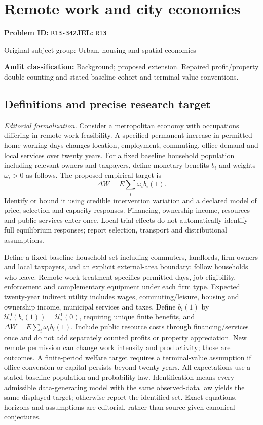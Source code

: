 \documentclass[11pt,a4paper]{article}
\begin{document}
\section*{Remote work and city economies}
\textbf{Problem ID:} \texttt{R13-342}\quad \textbf{JEL:} \texttt{R13}\par
\label{problem:OP-0468}
{\sffamily\small\color{muted}Original subject group: Urban, housing and spatial economics\par}
\label{definitions:problem:30007750}
\textbf{Audit classification:} Background; proposed extension. Repaired profit/property double counting and stated baseline-cohort and terminal-value conventions.
\subsection*{Definitions and precise research target}
\textit{Editorial formalization.} Consider a metropolitan economy with occupations differing in remote-work feasibility. A specified permanent increase in permitted home-working days changes location, employment, commuting, office demand and local services over twenty years. For a fixed baseline household population including relevant owners and taxpayers, define monetary benefits \(b_i\) and weights \(\omega_i>0\) as follows. The proposed empirical target is \[\Delta W=E\sum_i\omega_i b_i(1).\] Identify or bound it using credible intervention variation and a declared model of price, selection and capacity responses. Financing, ownership income, resources and public services enter once. Local trial effects do not automatically identify full equilibrium responses; report selection, transport and distributional assumptions.

Define a fixed baseline household set including commuters, landlords, firm owners and local taxpayers, and an explicit external-area boundary; follow households who leave. Remote-work treatment specifies permitted days, job eligibility, enforcement and complementary equipment under each firm type. Expected twenty-year indirect utility includes wages, commuting/leisure, housing and ownership income, municipal services and taxes. Define \(b_i(1)\) by \(\mathcal U_i^0(b_i(1))=\mathcal U_i^1(0)\), requiring unique finite benefits, and \(\Delta W=E\sum_i\omega_i b_i(1)\). Include public resource costs through financing/services once and do not add separately counted profits or property appreciation. New remote permission can change work intensity and productivity; those are outcomes. A finite-period welfare target requires a terminal-value assumption if office conversion or capital persists beyond twenty years. All expectations use a stated baseline population and probability law. Identification means every admissible data-generating model with the same observed-data law yields the same displayed target; otherwise report the identified set. Exact equations, horizons and assumptions are editorial, rather than source-given canonical conjectures.
\end{document}
